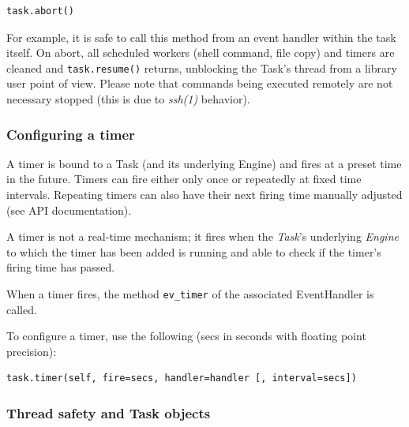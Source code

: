 \documentclass[english,a4paper]{csuserguide}
\newcommand{\Task}{\textit{Task}\xspace}
\newcommand{\Engine}{\textit{Engine}\xspace}
\begin{document}
\begin{lstlisting}[breaklines=true, breakatwhitespace=true]
task.abort()
\end{lstlisting}

For example, it is safe to call this method from an event handler within the task itself. On abort, all scheduled workers (shell command, file copy) and timers are cleaned and \lstinline+task.resume()+ returns, unblocking the Task's thread from a library user point of view. Please note that commands being executed remotely are not necessary stopped (this is due to \textit{ssh(1)} behavior).

\subsubsection{Configuring a timer}

A timer is bound to a Task (and its underlying Engine) and fires at a preset time in the future. Timers can fire either only once or repeatedly at fixed time intervals. Repeating timers can also have their next firing time manually adjusted (see API documentation).

A timer is not a real-time mechanism; it fires when the \Task's underlying \Engine to which the timer has been added is running and able to check if the timer's firing time has passed.

When a timer fires, the method \lstinline+ev_timer+ of the associated EventHandler is called.

To configure a timer, use the following (secs in seconds with floating point precision):
\medskip
\begin{lstlisting}[breaklines=true, breakatwhitespace=true]
task.timer(self, fire=secs, handler=handler [, interval=secs])
\end{lstlisting}

\subsubsection{Thread safety and Task objects}
\end{document}
